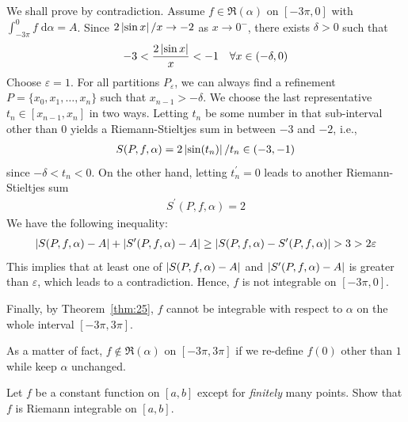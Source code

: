 \documentclass[thmcnt=section, 12pt]{my-elegantbook}
\begin{document}
\begin{example}
    We shall prove by contradiction. Assume $f \in \mathfrak{R}(\alpha)$ on $[-3\pi, 0]$ with $\int_{-3\pi}^{0} f \; \mathrm{d}\alpha = A$. Since $2\left\lvert \sin x \right\rvert / x \to -2$ as $x \to 0^{-}$, there exists $\delta > 0$ such that
    \begin{align*}
        -3 < \frac{2\left\lvert \sin x \right\rvert}{x} < -1
        \quad \forall x \in (-\delta, 0)
    \end{align*}
    Choose $\varepsilon = 1$. For all partitions $P_\varepsilon$, we can always find a refinement $P=\{x_0, x_1, \ldots, x_n\}$ such that $x_{n-1} > -\delta$. We choose the last representative $t_n \in [x_{n-1}, x_n]$ in two ways. Letting $t_n$ be some number in that sub-interval other than $0$ yields a Riemann-Stieltjes sum in between $-3$ and $-2$, i.e.,
    \begin{align*}
        S(P,f,\alpha) = 2 \left\lvert \sin(t_n) \right\rvert / t_n \in (-3, -1)
    \end{align*}
    since $-\delta < t_n < 0$. On the other hand, letting $t^\prime_n = 0$ leads to another Riemann-Stieltjes sum
    \begin{align*}
        S^\prime(P,f,\alpha) = 2
    \end{align*}
    We have the following inequality:
    \begin{align*}
        \left\lvert S(P,f,\alpha) - A \right\rvert + \left\lvert S^\prime(P,f,\alpha) - A \right\rvert
        \geq \left\lvert S(P,f,\alpha) - S^\prime(P,f,\alpha) \right\rvert
        > 3 > 2\varepsilon
    \end{align*}
    This implies that at least one of $\left\lvert S(P,f,\alpha) - A \right\rvert $ and $ \left\lvert S^\prime(P,f,\alpha) - A \right\rvert $ is greater than $\varepsilon$, which leads to a contradiction. Hence, $f$ is not integrable on $[-3\pi, 0]$.

    Finally, by Theorem~\ref{thm:25}, $f$ cannot be integrable with respect to $\alpha$ on the whole interval $[-3\pi, 3\pi]$.

    As a matter of fact, $f \notin \mathfrak{R}(\alpha)$ on $[-3\pi, 3\pi]$ if we re-define $f(0)$ other than $1$ while keep $\alpha$ unchanged.
    \label{eg:4}
\end{example}

\begin{exercise}
    Let $f$ be a constant function on $[a, b]$ except for \textit{finitely} many points. Show that $f$ is Riemann integrable on $[a, b]$.

\end{exercise}
\end{document}
